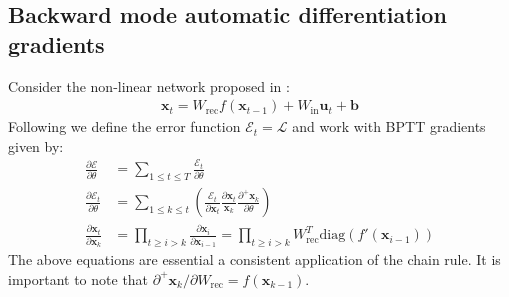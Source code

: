 \documentclass{article}
\begin{document}
\subsection{Backward mode automatic differentiation gradients}
Consider the non-linear network proposed in \cite{Pascanu}:
\begin{align}
\mathbf{x}_t  = W_{\text{rec}}f(\mathbf{x}_{t-1}) + W_{\text{in}}\mathbf{u}_t + \textbf{b}
\end{align}
Following \cite{Pascanu} we define the error function $\mathcal{E}_t = \mathcal{L}$ and work with BPTT gradients given by:
\begin{align}
\frac{\partial \mathcal{E}}{\partial \theta} &= \sum_{1 \leq t \leq T} \frac{\mathcal{E}_t}{\partial \theta} \\
\frac{\partial\mathcal{E}_t}{\partial\theta} &= \sum_{1 \leq k \leq t}( \frac{\mathcal{E}_t}{\partial \mathbf{x}_t} \frac{\partial \mathbf{x}_t}{ \mathbf{x}_k} \frac{\partial^+ \mathbf{x}_k}{\partial \theta}) \label{eq:gradsum}\\
\frac{\partial \mathbf{x}_t}{ \partial \mathbf{x}_k} &= \prod_{t \geq i > k} \frac{\partial \mathbf{x}_i}{ \partial \mathbf{x}_{i-1}} = \prod_{t \geq i > k} W^T_{\text{rec}} \text{diag}(f'(\mathbf{x}_{i-1}))
\end{align}
The above equations are essential a consistent application of the chain rule. It is important to note that $\partial^+ \mathbf{x}_{k} / \partial W_\text{rec} = f(\mathbf{x}_{k-1})$.
\end{document}
